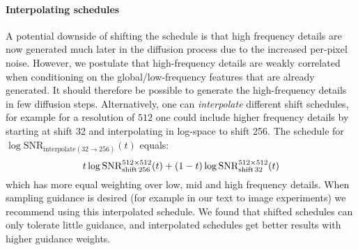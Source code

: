 \paragraph{Interpolating schedules}
A potential downside of shifting the schedule is that high frequency details are now generated much later in the diffusion process due to the increased per-pixel noise. However, we postulate that high-frequency details are weakly correlated when conditioning on the global/low-frequency features that are already generated. It should therefore be possible to generate the high-frequency details in few diffusion steps. Alternatively, one can \textit{interpolate} different shift schedules, for example for a resolution of $512$ one could include higher frequency details by starting at shift 32 and interpolating in log-space to shift 256. The schedule for $\log \mathrm{SNR}_{\mathrm{interpolate} (32 \to 256)}(t)$ equals:
\begin{equation}\small
     t \log \mathrm{SNR}_{\mathrm{shift} \, 256}^{512 \times 512}(t) + (1 - t) \log \mathrm{SNR}_{\mathrm{shift} \, 32}^{512 \times 512}(t)
\end{equation}
which has more equal weighting over low, mid and high frequency details. When sampling guidance is desired (for example in our text to image experiments) we recommend using this interpolated schedule. We found that shifted schedules can only tolerate little guidance, and interpolated schedules get better results with higher guidance weights.

